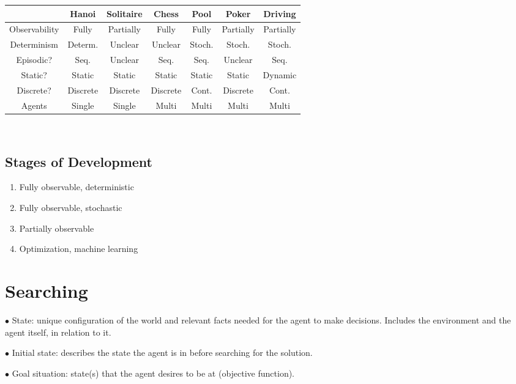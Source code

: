 \documentclass[english,openany]{book}
\begin{document}
    \begin{tabular}{|c|c|c|c|c|c|c|}
        \hline
        & Hanoi & Solitaire & Chess & Pool & Poker & Driving \\
        \hline
        Observability & Fully & Partially & Fully & Fully & Partially & Partially\\
        Determinism & Determ. & Unclear & Unclear & Stoch. & Stoch. & Stoch.\\
        Episodic? & Seq. & Unclear & Seq. & Seq. & Unclear & Seq.\\
        Static? & Static & Static & Static & Static & Static & Dynamic\\
        Discrete? & Discrete & Discrete & Discrete & Cont. & Discrete & Cont.\\
        Agents & Single & Single & Multi & Multi & Multi & Multi\\
        \hline
    \end{tabular}\\
    
    \subsection{Stages of Development}
    
    \begin{enumerate}
        \item Fully observable, deterministic
    
        \item Fully observable, stochastic
    
        \item Partially observable
    
        \item Optimization, machine learning 
    \end{enumerate}
    
    \section{Searching}
    
    $\bullet$ State: unique configuration of the world and relevant facts needed for the agent to make decisions. Includes the environment and the agent itself, in relation to it.
    
    $\bullet$ Initial state: describes the state the agent is in before searching for the solution.
    
    $\bullet$ Goal situation: state(s) that the agent desires to be at (objective function).
    
\end{document}
